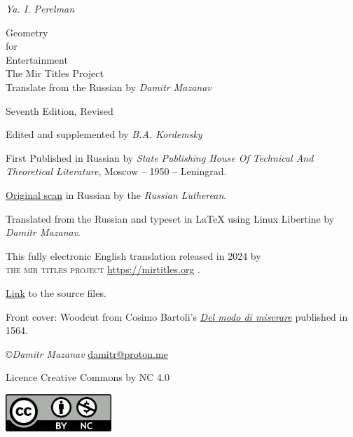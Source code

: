 

\cleardoublepage
\thispagestyle{empty}
\begin{fullwidth}
\begin{center}

{\LARGE \emph{Ya. I. Perelman}}

{\Huge Geometry\\ for \\ Entertainment}\\[2cm]




The Mir Titles Project\\

{\small Translate from the Russian by \emph{Damitr Mazanav}}

\end{center}
\end{fullwidth}
\cleardoublepage

\thispagestyle{empty}
\vfill
\begin{small}

{\noindent
Seventh Edition, Revised

Edited and supplemented by \emph{B.A. Kordemsky}

First Published in Russian by \emph{State Publishing House Of Technical And Theoretical Literature}, Moscow -- 1950 -- Leningrad.

\href{https://archive.org/details/20220910_perelman_geometry/}{Original scan} in Russian by the \emph{Russian Lutherean}.

Translated from the Russian and typeset in \LaTeX{} using Linux Libertine by \emph{Damitr Mazanav}.

This fully electronic English translation released in 2024 by \\\textsc{the mir titles project} \url{https://mirtitles.org} .

\href{https://gitlab.com/mirtitles/perelman-geometry}{Link} to the source files. 
 
Front cover: Woodcut from Cosimo Bartoli's \href{https://archive.org/details/cosimobartolidel00bart}{\emph{Del modo di misvrare}} published in 1564. 

\copyright \emph{Damitr Mazanav} \href{mailto:damitr@proton.me}{damitr@proton.me}

Licence Creative Commons by NC 4.0}

\includegraphics[width=0.3\textwidth]{figures/cc-by-nc.pdf}

\end{small}

